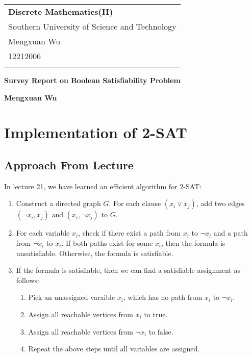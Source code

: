 \documentclass[a4paper,12pt]{article}
\begin{document}
\thispagestyle{empty} %

\begin{tabular}{p{15.5cm}}
{\large \bf Discrete Mathematics(H)} \\
Southern University of Science and Technology \\ Mengxuan Wu \\ 12212006 \\
\hline
\\
\end{tabular}

\vspace*{0.3cm} %

\begin{center}
	{\Large \bf Survey Report on Boolean Satisfiability Problem}
	\vspace{2mm}

	{\bf Mengxuan Wu}
		
\end{center}  

\vspace{0.4cm}

\section{Implementation of 2-SAT}

\subsection{Approach From Lecture}

In lecture 21, we have learned an efficient algorithm for 2-SAT:
\begin{enumerate}
	\item Construct a directed graph $G$.
		For each clause $(x_i \vee x_j)$, add two edges $(\neg x_i, x_j)$ and $(x_i, \neg x_j)$ to $G$.
	\item For each variable $x_i$, check if there exist a path from $x_i$ to $\neg x_i$ and a path from $\neg x_i$ to $x_i$.
		If both paths exist for some $x_i$, then the formula is unsatisfiable.
		Otherwise, the formula is satisfiable.
	\item If the formula is satisfiable, then we can find a satisfiable assignment as follows:
		\begin{enumerate}
			\item Pick an unassigned varaible $x_i$, which has no path from $x_i$ to $\neg x_i$.
			\item Assign all reachable vertices from $x_i$ to true.
			\item Assign all reachable vertices from $\neg x_i$ to false.
			\item Repeat the above steps until all variables are assigned.
		\end{enumerate}
\end{enumerate}
\end{document}
